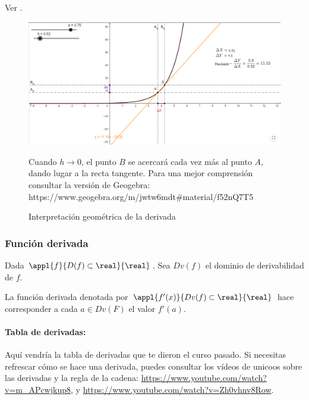 Ver .

\begin{figure}[hbt]
\centering
\includegraphics[scale=0.5]{img/DerivadaInterGeometrica}
\label{fig::funinterpretacionderivadapunto}
\caption{Interpretación geométrica de la derivada} Cuando $h\to0$, el punto $B$ se acercará cada vez más al punto $A$, dando lugar a la recta tangente. 
%
Para una mejor comprensión consultar la versión de Geogebra: https://www.geogebra.org/m/jwtw6mdt\#material/f52nQ7T5


\end{figure} 


\subsubsection{Función derivada}

\begin{defn}
Dada $\appl{f}{D(f)\subset\real}{\real}$. Sea $Dv(f)$ el dominio de derivabilidad de $f$.

La función derivada denotada por $\appl{f'(x)}{Dv(f)\subset\real}{\real}$ hace corresponder a cada $a\in Dv(F)$ el valor $f'(a)$.
\end{defn}




\paragraph{Tabla de derivadas: } Aquí vendría la tabla de derivadas que te dieron el curso pasado. 
%
Si necesitas refrescar cómo se hace una derivada, puedes consultar los vídeos de unicoos sobre las derivadas y la regla de la cadena: \href{https://www.youtube.com/watch?v=m_APcwjkup8}{https://www.youtube.com/watch?v=m\_APcwjkup8}, y \href{https://www.youtube.com/watch?v=Zh0vhnv8Row}{https://www.youtube.com/watch?v=Zh0vhnv8Row}.

